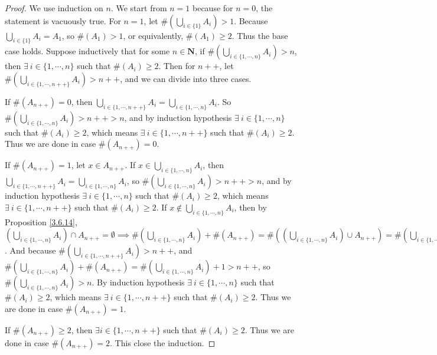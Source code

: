 \begin{proof}
We use induction on \(n\).
We start from \(n = 1\) because for \(n = 0\), the statement is vacuously true.
For \(n = 1\), let \(\#(\bigcup_{i \in \{1\}} A_i) > 1\).
Because \(\bigcup_{i \in \{1\}} A_i = A_1\), so \(\#(A_1) > 1\), or equivalently, \(\#(A_1) \geq 2\).
Thus the base case holds.
Suppose inductively that for some \(n \in \mathbf{N}\), if \(\#(\bigcup_{i \in \{1, \cdots, n\}} A_i) > n\), then \(\exists\ i \in \{1, \cdots, n\}\) such that \(\#(A_i) \geq 2\).
Then for \(n++\), let \(\#(\bigcup_{i \in \{1, \cdots, n++\}} A_i) > n++\), and we can divide into three cases.

If \(\#(A_{n++}) = 0\), then \(\bigcup_{i \in \{1, \cdots, n++\}} A_i = \bigcup_{i \in \{1, \cdots, n\}} A_i\).
So \(\#(\bigcup_{i \in \{1, \cdots, n\}} A_i) > n++ > n\), and by induction hypothesis \(\exists\ i \in \{1, \cdots, n\}\) such that \(\#(A_i) \geq 2\), which means \(\exists\ i \in \{1, \cdots, n++\}\) such that \(\#(A_i) \geq 2\).
Thus we are done in case \(\#(A_{n++}) = 0\).

If \(\#(A_{n++}) = 1\), let \(x \in A_{n++}\).
If \(x \in \bigcup_{i \in \{1, \cdots, n\}} A_i\), then \(\bigcup_{i \in \{1, \cdots, n++\}} A_i = \bigcup_{i \in \{1, \cdots, n\}} A_i\), so \(\#(\bigcup_{i \in \{1, \cdots, n\}} A_i) > n++ > n\), and by induction hypothesis \(\exists\ i \in \{1, \cdots, n\}\) such that \(\#(A_i) \geq 2\), which means \(\exists\ i \in \{1, \cdots, n++\}\) such that \(\#(A_i) \geq 2\).
If \(x \notin \bigcup_{i \in \{1, \cdots, n\}} A_i\), then by Proposition \ref{3.6.14}, \((\bigcup_{i \in \{1, \cdots, n\}} A_i) \cap A_{n++} = \emptyset \implies \#(\bigcup_{i \in \{1, \cdots, n\}} A_i) + \#(A_{n++}) = \#((\bigcup_{i \in \{1, \cdots, n\}} A_i) \cup A_{n++}) = \#(\bigcup_{i \in \{1, \cdots, n++\}} A_i)\).
And because \(\#(\bigcup_{i \in \{1, \cdots, n++\}} A_i) > n++\), and \(\#(\bigcup_{i \in \{1, \cdots, n\}} A_i) + \#(A_{n++}) = \#(\bigcup_{i \in \{1, \cdots, n\}} A_i) + 1 > n++\), so \(\#(\bigcup_{i \in \{1, \cdots, n\}} A_i) > n\).
By induction hypothesis \(\exists\ i \in \{1, \cdots, n\}\) such that \(\#(A_i) \geq 2\), which means \(\exists\ i \in \{1, \cdots, n++\}\) such that \(\#(A_i) \geq 2\).
Thus we are done in case \(\#(A_{n++}) = 1\).

If \(\#(A_{n++}) \geq 2\), then \(\exists i \in \{1, \cdots, n++\}\) such that \(\#(A_i) \geq 2\).
Thus we are done in case \(\#(A_{n++}) = 2\).
This close the induction.
\end{proof}